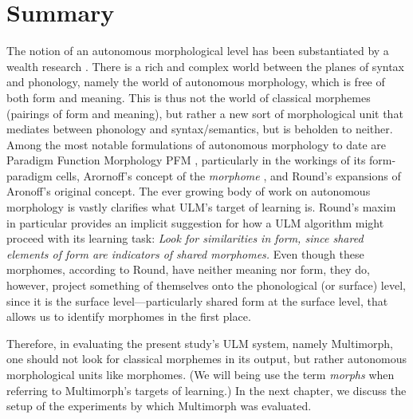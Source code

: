 \section{Summary}\label{sum}
The notion of an autonomous morphological level
has been substantiated by a wealth research \citep[including, e.g.,][]{stump:2001, aronoff:1994, round:2011, round:2015}.
There is a rich and complex 
world between the planes of syntax and phonology, namely the world of autonomous morphology, which is free of both form and meaning. This is thus not the world of classical morphemes (pairings of form and meaning), but rather a new sort of morphological unit that mediates between phonology and
syntax/semantics, but is beholden to neither.  
Among the most notable formulations of autonomous morphology to date are Paradigm Function Morphology \ac{PFM} \citep{stump:2001}, particularly in the workings of its form-paradigm cells, Arornoff's
concept of the \emph{morphome} \citep{aronoff:1994}, and Round's expansions \citep[e.g.,][]{2011,2015,2016} of Aronoff's original concept. The ever growing body of work on autonomous morphology is vastly clarifies what \ac{ULM}'s target of learning is. Round's maxim in particular provides an implicit suggestion for how a \ac{ULM} algorithm might proceed with its learning task: \textit{Look for similarities in form, since shared elements of form are indicators of shared morphomes.} Even though these morphomes, according to Round, have neither meaning nor form, they do, however, project something of themselves onto the phonological (or surface) level, since it is the surface level---particularly shared  form at the surface level, that allows us to identify morphomes in the first place. 

Therefore, in evaluating the present study's ULM system, namely Multimorph, one should not look for classical morphemes in its output, but rather autonomous morphological units like morphomes. (We will being use the term \emph{morphs} when referring to Multimorph's targets of learning.)
In the next chapter, we discuss the setup of the experiments by which Multimorph was evaluated.